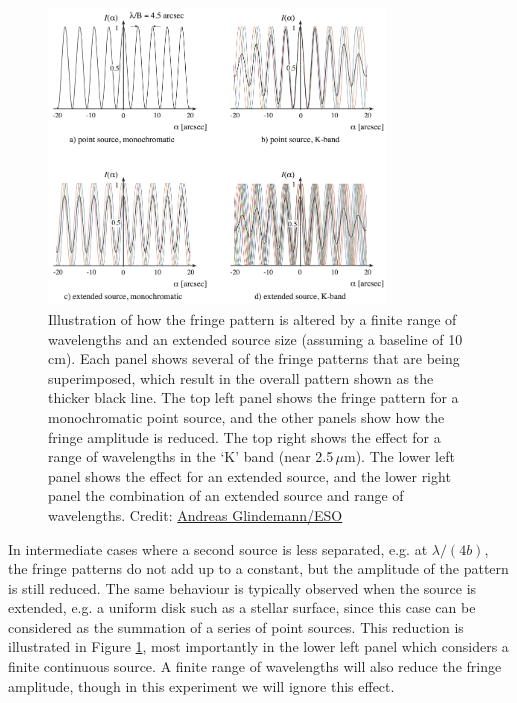 \documentclass[11pt]{article}
\begin{document}
\begin{figure}[h]
    \centering
    \includegraphics[width=0.8\textwidth]{doc/coherence.png}
    \caption{Illustration of how the fringe pattern is altered by a finite range of wavelengths and an extended source size (assuming a baseline of 10\,cm). Each panel shows several of the fringe patterns that are being superimposed, which result in the overall pattern shown as the thicker black line. The top left panel shows the fringe pattern for a monochromatic point source, and the other panels show how the fringe amplitude is reduced. The top right shows the effect for a range of wavelengths in the `K' band (near 2.5\,$\mu$m). The lower left panel shows the effect for an extended source, and the lower right panel the combination of an extended source and range of wavelengths. Credit: \href{https://www.eso.org/sci/facilities/paranal/telescopes/vlti/tuto/tutorial_spatial_interferometry.pdf}{Andreas Glindemann/ESO}}
    \label{fig:coherence}
\end{figure}

In intermediate cases where a second source is less separated, e.g. at $\lambda/(4b)$, the fringe patterns do not add up to a constant, but the amplitude of the pattern is still reduced. The same behaviour is typically observed when the source is extended, e.g. a uniform disk such as a stellar surface, since this case can be considered as the summation of a series of point sources. This reduction is illustrated in Figure \ref{fig:coherence}, most importantly in the lower left panel which considers a finite continuous source. A finite range of wavelengths will also reduce the fringe amplitude, though in this experiment we will ignore this effect.
\end{document}
